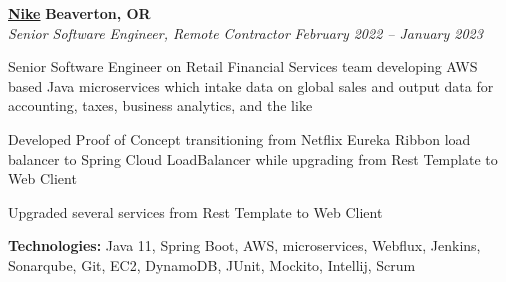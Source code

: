 %
    \headerrow
        {\textbf{\href{https://www.nike.com/}{Nike}}}
        {\textbf{Beaverton, OR}}
    \\
    \headerrow
        {\emph{Senior Software Engineer, Remote Contractor}}
        {\emph{February 2022 -- January 2023}}
    \begin{itemize*}
        \item Senior Software Engineer on Retail Financial Services team developing AWS based Java microservices which intake data on global sales and output data for accounting, taxes, business analytics, and the like
        \item Developed Proof of Concept transitioning from Netflix Eureka Ribbon load balancer to Spring Cloud LoadBalancer while upgrading from Rest Template to Web Client
        \item Upgraded several services from Rest Template to Web Client
    \end{itemize*}

    \hspace{1.0em}
        {\textbf{Technologies:} Java 11, Spring Boot, AWS, microservices, Webflux, Jenkins, Sonarqube, Git, EC2, DynamoDB, JUnit, Mockito, Intellij, Scrum}

